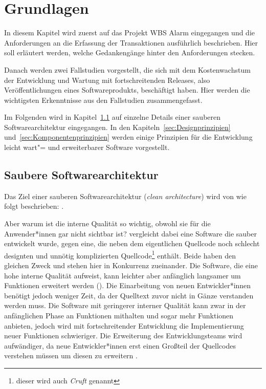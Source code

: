 \chapter{Grundlagen}
\label{ch:Grundlagen}

In diesem Kapitel wird zuerst auf das Projekt WBS Alarm eingegangen und die Anforderungen an die Erfassung der Transaktionen ausführlich beschrieben. Hier soll erläutert werden, welche Gedankengänge hinter den Anforderungen stecken. 

Danach werden zwei Fallstudien vorgestellt, die sich mit dem Kostenwachstum der Entwicklung und Wartung mit fortschreitenden Releases, also Veröffentlichungen eines Softwareprodukts, beschäftigt haben. Hier werden die wichtigsten Erkenntnisse aus den Fallstudien zusammengefasst.

Im Folgenden wird in Kapitel~\ref{sec:Softwarearchitektur} auf einzelne Details einer sauberen Softwarearchitektur eingegangen. In den Kapiteln~\ref{sec:Designprinzipien} und~\ref{sec:Komponentenprinzipien} werden einige Prinzipien für die Entwicklung leicht wart"= und erweiterbarer Software vorgestellt. 




\section{Saubere Softwarearchitektur}
\label{sec:Softwarearchitektur}

Das Ziel einer sauberen Softwarearchitektur (\textit{clean architecture}) wird von  wie folgt beschrieben: .

Aber warum ist die interne Qualität so wichtig, obwohl sie für die Anwender*innen  gar nicht sichtbar ist?  vergleicht dabei eine Software die sauber entwickelt wurde, gegen eine, die neben dem eigentlichen Quellcode noch schlecht designten und unnötig komplizierten Quellcode\footnote{dieser wird auch \textit{Cruft} genannt} enthält. Beide haben den gleichen Zweck und stehen hier  in Konkurrenz zueinander. Die Software, die eine hohe interne Qualität aufweist, kann leichter aber anfänglich langsamer um Funktionen erweitert werden (). Die Einarbeitung von neuen Entwickler*innen benötigt jedoch weniger Zeit, da der Quelltext zuvor nicht in Gänze verstanden werden muss. 
Die Software mit geringerer interner Qualität kann zwar in der anfänglichen Phase an Funktionen mithalten und sogar mehr Funktionen anbieten, jedoch wird mit fortschreitender Entwicklung die Implementierung neuer Funktionen schwieriger. Die Erweiterung des Entwicklungsteams wird aufwändiger, da neue Entwickler*innen erst einen Großteil der Quellcodes verstehen müssen um diesen zu erweitern \citep[vgl.][]{fowler2019}.

